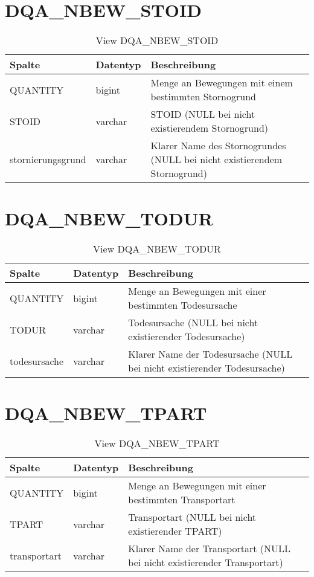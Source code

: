   \section{DQA\_NBEW\_STOID}

  \begin{table}[ht]
    \centering
    \caption{View DQA\_NBEW\_STOID}
    \label{tab:dqanbewstoid}
    \begin{tabular}{||l|l|p{10cm}||}
      \hline
      Spalte & Datentyp & Beschreibung \\ [0.5ex] \hline \hline
QUANTITY & bigint & Menge an Bewegungen mit einem bestimmten Stornogrund \\ \hline
STOID & varchar & STOID (NULL bei nicht existierendem Stornogrund)\\ \hline
stornierungsgrund & varchar & Klarer Name des Stornogrundes (NULL bei nicht existierendem Stornogrund)\\ \hline
    \end{tabular}
  \end{table}

  \section{DQA\_NBEW\_TODUR}

  \begin{table}[ht]
    \centering
    \caption{View DQA\_NBEW\_TODUR}
    \label{tab:dqanbewtodur}
    \begin{tabular}{||l|l|p{10cm}||}
      \hline
      Spalte & Datentyp & Beschreibung \\ [0.5ex] \hline \hline
QUANTITY & bigint & Menge an Bewegungen mit einer bestimmten Todesursache \\ \hline
TODUR & varchar & Todesursache (NULL bei nicht existierender Todesursache)\\ \hline
todesursache & varchar & Klarer Name der Todesursache (NULL bei nicht existierender Todesursache)\\ \hline
    \end{tabular}
  \end{table}
 \clearpage
  \section{DQA\_NBEW\_TPART}

  \begin{table}[ht]
    \centering
    \caption{View DQA\_NBEW\_TPART}
    \label{tab:dqanbewtpart}
    \begin{tabular}{||l|l|p{10cm}||}
      \hline
      Spalte & Datentyp & Beschreibung \\ [0.5ex] \hline \hline
QUANTITY & bigint & Menge an Bewegungen mit einer bestimmten Transportart \\ \hline
TPART & varchar & Transportart (NULL bei nicht existierender TPART)\\ \hline
transportart & varchar & Klarer Name der Transportart (NULL bei nicht existierender Transportart)\\ \hline
    \end{tabular}
  \end{table}

